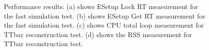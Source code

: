 \documentclass[12pt]{iopart}
\begin{document}
\begin{figure}[h]
\begin{minipage}{.48\textwidth}
\end{minipage}\hfill
\begin{minipage}{.48\textwidth}
 \end{minipage}
 \caption{Performance results: (a) shows ESetup Lock RT measurement for the fast simulation test. (b) shows ESetup Get RT measurement for the fast simulation test. (c) shows CPU total loop measurement for TTbar reconstruction test. (d) shows the RSS measurement for TTbar reconstruction test.}
\label{fig:performance1}
\end{figure}
\end{document}
